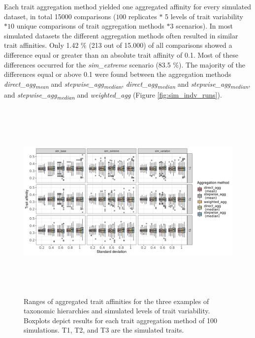 \documentclass{article}
\begin{document}
Each trait aggregation method yielded one aggregated affinity for every simulated dataset, in total 15000 comparisons ($100$ replicates $*$ 5 levels of trait variability $* 10$ unique comparisons of trait aggregation methods $* 3$ scenarios). In most simulated datasets the different aggregation methods often resulted in similar trait affinities. Only 1.42 \% (213 out of 15.000) of all comparisons showed a difference equal or greater than an absolute trait affinity of 0.1. Most of these differences occurred for the \textit{sim\_extreme} scenario (83.5 \%). The majority of the differences equal or above 0.1 were found between the aggregation methods \textit{direct\_agg\textsubscript{mean}} and \textit{stepwise\_agg\textsubscript{median}}, \textit{direct\_agg\textsubscript{median}} and \textit{stepwise\_agg\textsubscript{median}}, and \textit{stepwise\_agg\textsubscript{median}} and \textit{weighted\_agg} (Figure \ref{fig:sim_indv_runs}). 

\begin{figure}[H]
  \centering
  \includegraphics[width=16.5cm, height=10cm]{Overview_sim_results.png}
  \caption{Ranges of aggregated trait affinities for the three examples of taxonomic hierarchies and simulated levels of trait variability. Boxplots depict results for each trait aggregation method of 100 simulations. T1, T2, and T3 are the simulated traits.}
  \label{fig:overview_sim_results}
\end{figure}
\end{document}
